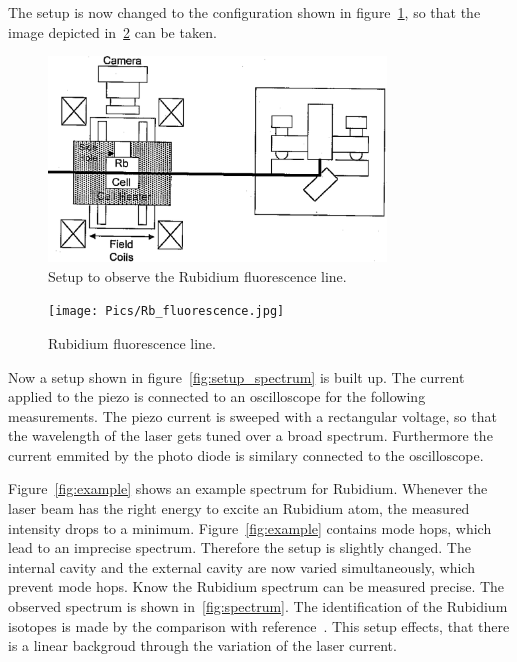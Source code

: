 The setup is now changed to the configuration shown in figure~\ref{fig:setup_fluorescence},
so that the image depicted in~\ref{fig:fluorescence} can be taken.

\begin{figure}
  \centering
  \includegraphics[width=0.8\textwidth]{Pics/setup_fluorescence.png}
  \caption{Setup to observe the Rubidium fluorescence line.\cite{anleitung}}
  \label{fig:setup_fluorescence}
\end{figure}

\begin{figure}
  \centering
  \texttt{[image: Pics/Rb\_fluorescence.jpg]}
  \caption{Rubidium fluorescence line.}
  \label{fig:fluorescence}
\end{figure}

\FloatBarrier
Now a setup shown in figure~\ref{fig:setup_spectrum} is built up.
The current applied to the piezo is connected to an oscilloscope
for the following measurements. The piezo current is sweeped with a rectangular
voltage, so that the wavelength of the laser gets tuned over a broad spectrum.
Furthermore the current emmited by the photo diode is similary connected to the oscilloscope.

Figure~\ref{fig:example} shows an example spectrum for Rubidium. Whenever
the laser beam has the right energy to excite an Rubidium atom, the
measured intensity drops to a minimum. Figure~\ref{fig:example} contains
mode hops, which lead to an imprecise spectrum.
Therefore the setup is slightly changed. The internal cavity and the external cavity
are now varied simultaneously, which prevent mode hops.
Know the Rubidium spectrum can be measured precise. The observed spectrum
is shown in~\ref{fig:spectrum}. The identification of the Rubidium isotopes
is made by the comparison with reference~\cite{anleitung}.
This setup effects, that there is a linear backgroud through the variation
of the laser current.

